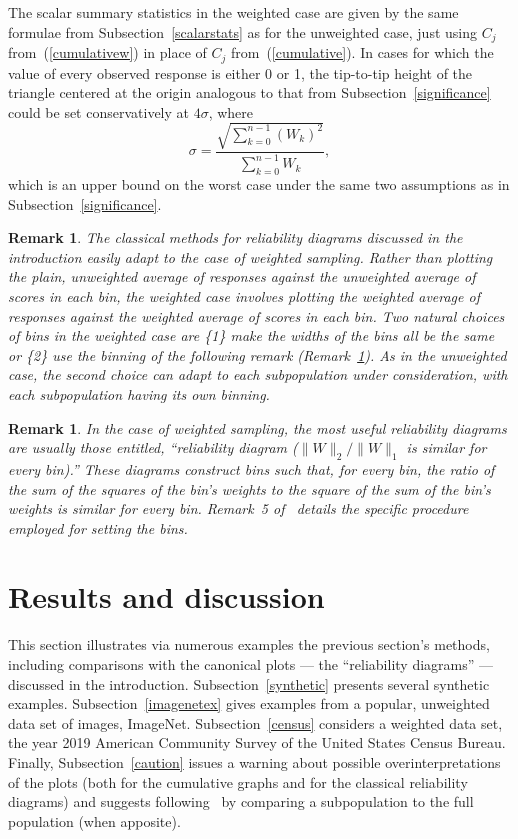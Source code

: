 \documentclass{article}
\newtheorem{remark1}[theorem]{Remark}
\newenvironment{remark}{\begin{remark1} \rm}{\end{remark1}}
\begin{document}
The scalar summary statistics in the weighted case are given
by the same formulae from Subsection~\ref{scalarstats}
as for the unweighted case, just using $C_j$ from~(\ref{cumulativew})
in place of $C_j$ from~(\ref{cumulative}).
In cases for which the value of every observed response is either 0 or 1,
the tip-to-tip height of the triangle centered at the origin
analogous to that from Subsection~\ref{significance}
could be set conservatively at $4\sigma$, where
%
\begin{equation}
\label{stddevw}
\sigma = \frac{\sqrt{\sum_{k=0}^{n-1} (W_k)^2}}{\sum_{k=0}^{n-1} W_k},
\end{equation}
%
which is an upper bound on the worst case under the same two assumptions
as in Subsection~\ref{significance}.


\begin{remark}
\label{weightedremark}
The classical methods for reliability diagrams discussed in the introduction
easily adapt to the case of weighted sampling.
Rather than plotting the plain, unweighted average of responses
against the unweighted average of scores in each bin,
the weighted case involves plotting the weighted average of responses
against the weighted average of scores in each bin.
Two natural choices of bins in the weighted case are
\{1\} make the widths of the bins all be the same or
\{2\} use the binning of the following remark (Remark~\ref{equierrs}).
As in the unweighted case, the second choice can adapt to each subpopulation
under consideration, with each subpopulation having its own binning.
\end{remark}


\begin{remark}
\label{equierrs}
In the case of weighted sampling, the most useful reliability diagrams
are usually those entitled,
``reliability diagram ($\|W\|_2/\|W\|_1$ is similar for every bin).''
These diagrams construct bins such that, for every bin,
the ratio of the sum of the squares of the bin's weights
to the square of the sum of the bin's weights is similar for every bin.
Remark~5 of~\cite{tygert} details the specific procedure employed
for setting the bins.
\end{remark}



\section{Results and discussion}
\label{results}


This section illustrates via numerous examples
the previous section's methods, including comparisons
with the canonical plots --- the ``reliability diagrams'' ---
discussed in the introduction.
Subsection~\ref{synthetic} presents several synthetic examples.
Subsection~\ref{imagenetex} gives examples
from a popular, unweighted data set of images, ImageNet.
Subsection~\ref{census} considers a weighted data set,
the year 2019 American Community Survey of the United States Census Bureau.
Finally, Subsection~\ref{caution} issues a warning
about possible overinterpretations of the plots (both for the cumulative graphs
and for the classical reliability diagrams)
and suggests following~\cite{tygert} by comparing a subpopulation
to the full population (when apposite).
\end{document}
